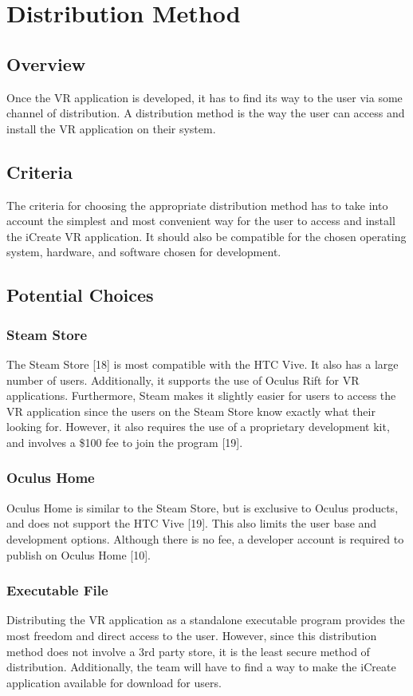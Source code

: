 \documentclass[letterpaper,10pt,onecolumn,compsoc]{IEEEtran}
\begin{document}
\section{Distribution Method}

\subsection{Overview}
Once the VR application is developed, it has to find its way to the user via some channel of distribution. A distribution method is the way the user can access and install the VR application on their system.

\subsection{Criteria}
The criteria for choosing the appropriate distribution method has to take into account the simplest and most convenient way for the user to access and install the iCreate VR application. It should also be compatible for the chosen operating system, hardware, and software chosen for development. 

\subsection{Potential Choices}

\subsubsection{Steam Store}
The Steam Store [18] is most compatible with the HTC Vive. It also has a large number of users. Additionally, it supports the use of Oculus Rift for VR applications. Furthermore, Steam makes it slightly easier for users to access the VR application since the users on the Steam Store know exactly what their looking for. However, it also requires the use of a proprietary development kit, and involves a \$100 fee to join the program [19].

\subsubsection{Oculus Home}
Oculus Home is similar to the Steam Store, but is exclusive to Oculus products, and does not support the HTC Vive [19]. This also limits the user base and development options. Although there is no fee, a developer account is required to publish on Oculus Home [10].

\subsubsection{Executable File}
Distributing the VR application as a standalone executable program provides the most freedom and direct access to the user. However, since this distribution method does not involve a 3rd party store, it is the least secure method of distribution. Additionally, the team will have to find a way to make the iCreate application available for download for users.
\end{document}
